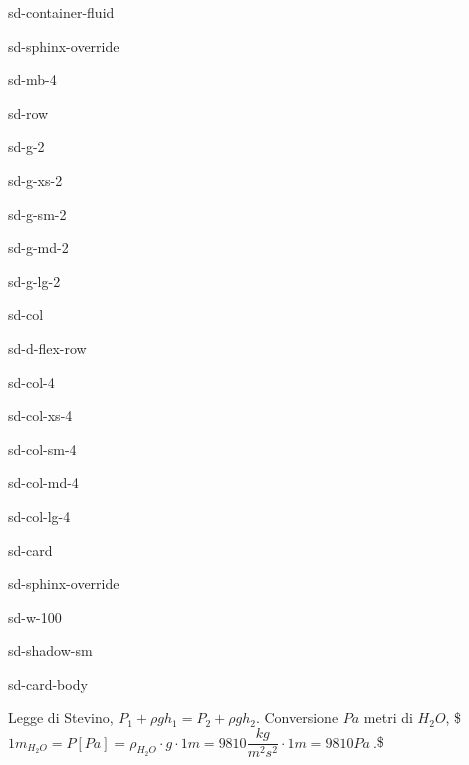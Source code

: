 \documentclass[letterpaper,10pt,italian]{jupyterBook}
\begin{document}
\begin{sphinxuseclass}{sd-container-fluid}
\begin{sphinxuseclass}{sd-sphinx-override}
\begin{sphinxuseclass}{sd-mb-4}
\begin{sphinxuseclass}{sd-row}
\begin{sphinxuseclass}{sd-g-2}
\begin{sphinxuseclass}{sd-g-xs-2}
\begin{sphinxuseclass}{sd-g-sm-2}
\begin{sphinxuseclass}{sd-g-md-2}
\begin{sphinxuseclass}{sd-g-lg-2}
\begin{sphinxuseclass}{sd-col}
\begin{sphinxuseclass}{sd-d-flex-row}
\begin{sphinxuseclass}{sd-col-4}
\begin{sphinxuseclass}{sd-col-xs-4}
\begin{sphinxuseclass}{sd-col-sm-4}
\begin{sphinxuseclass}{sd-col-md-4}
\begin{sphinxuseclass}{sd-col-lg-4}
\begin{sphinxuseclass}{sd-card}
\begin{sphinxuseclass}{sd-sphinx-override}
\begin{sphinxuseclass}{sd-w-100}
\begin{sphinxuseclass}{sd-shadow-sm}
\begin{sphinxuseclass}{sd-card-body}

\end{sphinxuseclass}
\end{sphinxuseclass}
\end{sphinxuseclass}
\end{sphinxuseclass}
\end{sphinxuseclass}
\end{sphinxuseclass}
\end{sphinxuseclass}
\end{sphinxuseclass}
\end{sphinxuseclass}
\end{sphinxuseclass}
\end{sphinxuseclass}
\end{sphinxuseclass}
\end{sphinxuseclass}
\end{sphinxuseclass}
\end{sphinxuseclass}
\end{sphinxuseclass}
\end{sphinxuseclass}
\end{sphinxuseclass}
\end{sphinxuseclass}
\end{sphinxuseclass}
\end{sphinxuseclass}
\sphinxAtStartPar
{} Legge di Stevino, \(P_1 + \rho g h_1 = P_2 + \rho g h_2\). Conversione
\(Pa\) \sphinxhyphen{} metri di \(H_2O\),
\$\(1 m_{{H_2O}} = P[Pa] = \rho_{H_2O} \cdot g \cdot 1 m =
9810 \dfrac{kg}{m^2 s^2} \cdot 1 m = 9810 Pa \ .\)\$
\end{document}
